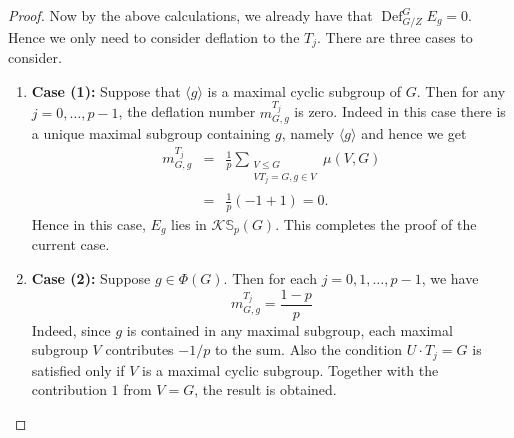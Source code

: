 \documentclass[12pt]{article}
\theoremstyle{plain}
\theoremstyle{definition}
\newcommand{\kerlin}{\mathbb S_p}
\newcommand{\defl}{\operatorname{Def}}
\begin{document}
\begin{proof}
Now by the above calculations, we already have that $\defl^G_{G/Z}E_g = 0$. Hence we only need to consider deflation to the $T_j$. There are three cases to consider.
\begin{enumerate}
    \item[] \textbf{Case (1):} Suppose that $\langle g\rangle$ is a maximal cyclic subgroup of $G$. Then for any $j= 0, \ldots, p-1$, the deflation number $m_{G, g}^{T_j}$ is zero. Indeed in this case there is a unique maximal subgroup containing $g$, namely $\langle g\rangle$ and hence we get
    \begin{eqnarray*}
    m_{G, g}^{T_j} &=& \frac{1}{p}\sum_{\substack{V\le G\\ VT_j = G, g\in V}} \mu(V, G) \\
    &=& \frac{1}{p} (-1 + 1) = 0.
    \end{eqnarray*}
    Hence in this case, $E_g$ lies in $\mathcal K\kerlin(G)$. This completes the proof of the current case.
    \item[] \textbf{Case (2):} Suppose $g\in\Phi(G)$. Then for each $j=0, 1, \ldots, p-1$, we have
    \[
    m_{G , g}^{T_j} = \frac{1-p}{p}
    \]
    Indeed, since $g$ is contained in any maximal subgroup, each maximal subgroup $V$ contributes $-1/p$ to the sum. Also the condition $U\cdot T_j = G$ is satisfied only if $V$ is a maximal cyclic subgroup. Together with the contribution $1$ from $V = G$, the result is obtained. 


\end{enumerate}
\end{proof}
\end{document}
